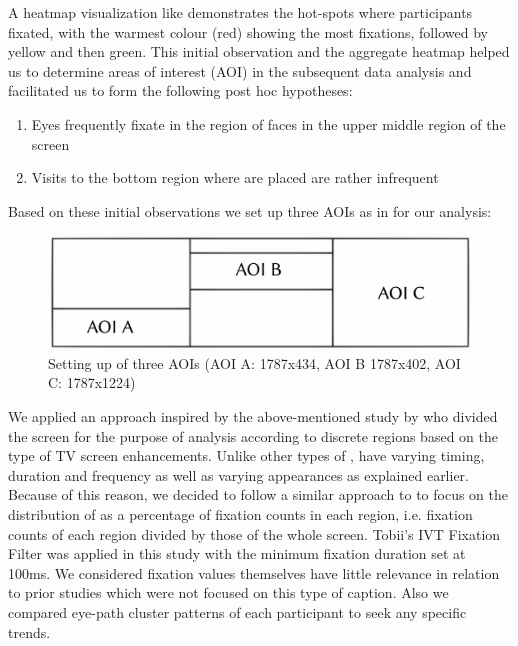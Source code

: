 \documentclass[output=paper]{langsci/langscibook}
\begin{document}
A heatmap visualization like  demonstrates the hot-spots where participants fixated, with the warmest colour (red) showing the most fixations, followed by yellow and then green. This initial observation and the aggregate heatmap helped us to determine areas of interest (AOI) in the subsequent  data analysis and facilitated us to form the following post hoc hypotheses:

\begin{enumerate}
\item Eyes frequently fixate in the region of faces in the upper middle region of the screen
\item Visits to the bottom region where  are placed are rather infrequent
\end{enumerate}

Based on these initial observations we set up three AOIs as in  for our analysis:

\begin{figure}
 \includegraphics[width=\textwidth]{figures/OHagan3.pdf}


	\caption{Setting up of three AOIs (AOI A: 1787x434, AOI B 1787x402, AOI C: 1787x1224)}
	\label{ohagan:fig:3}
\end{figure}

We applied an approach inspired by the above-mentioned study by \citet{josephson2006} who divided the screen for the purpose of analysis according to discrete regions based on the type of TV screen enhancements. Unlike other types of ,  have varying timing, duration and frequency as well as varying appearances as explained earlier.  Because of this reason, we decided to follow a similar approach to \citet{josephson2006} to focus on the distribution of  as a percentage of fixation counts in each region, i.e. fixation counts of each region divided by those of the whole screen.  Tobii's IVT Fixation Filter was applied in this study with the minimum fixation duration set at 100ms. We considered fixation values themselves have little relevance in relation to prior studies which were not focused on this type of caption. Also we compared eye-path cluster patterns of each participant to seek any specific trends.  
\end{document}
